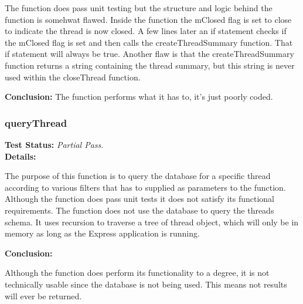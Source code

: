 \begin{flushleft}
\begin{flushleft}
The function does pass unit testing but the structure and logic behind the function is somehwat flawed. Inside the function the mClosed flag is set to close to indicate the thread is now closed. A few lines later an if statement checks if the mClosed flag is set and then calls the createThreadSummary function. That if statement will always be true. Another flaw is that the createThreadSummary function returns a string containing the thread summary, but this string is never used within the closeThread function. 

\textbf{Conclusion:}
The function performs what it has to, it's just poorly coded. 

\end{flushleft}
\subsubsection{queryThread}
\begin{flushleft}
\textbf{Test Status:} \emph{Partial Pass}. \\

\textbf{Details:}

The purpose of this function is to query the database for a specific thread according to various filters that has to supplied as parameters to the function. Although the function does pass unit tests it does not satisfy its functional requirements. The function does not use the database to query the threads schema. It uses recursion to traverse a tree of thread object, which will only be in memory as long as the Express application is running. 

\textbf{Conclusion:}

Although the function does perform its functionality to a degree, it is not technically usable since the database is not being used. This means not results will ever be returned.

\end{flushleft}


\end{flushleft}
